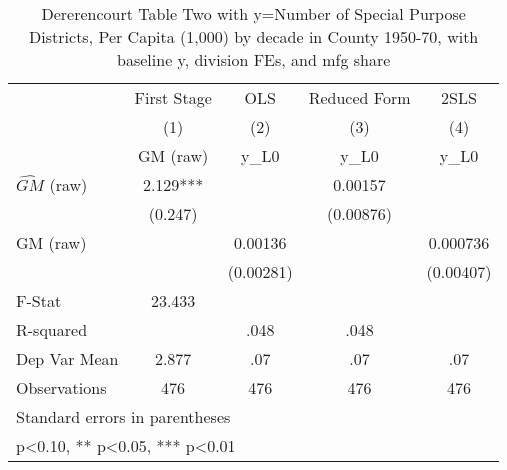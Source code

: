 \begin{table}[htbp]\centering
\def\sym#1{\ifmmode^{#1}\else\(^{#1}\)\fi}
\caption{Dererencourt Table Two with y=Number of Special Purpose Districts, Per Capita (1,000) by decade in County 1950-70, with baseline y, division FEs, and mfg share}
\begin{tabular}{l*{4}{c}}
\toprule
                    & First Stage   &         OLS   &Reduced Form   &        2SLS   \\
                    &\multicolumn{1}{c}{(1)}&\multicolumn{1}{c}{(2)}&\multicolumn{1}{c}{(3)}&\multicolumn{1}{c}{(4)}\\
                    &\multicolumn{1}{c}{GM  (raw)}&\multicolumn{1}{c}{y\_L0}&\multicolumn{1}{c}{y\_L0}&\multicolumn{1}{c}{y\_L0}\\
\midrule
$\hat{GM}$ (raw)    &       2.129***&               &     0.00157   &               \\
                    &     (0.247)   &               &   (0.00876)   &               \\
\addlinespace
GM  (raw)           &               &     0.00136   &               &    0.000736   \\
                    &               &   (0.00281)   &               &   (0.00407)   \\
\midrule
F-Stat              &      23.433   &               &               &               \\
R-squared           &               &        .048   &        .048   &               \\
Dep Var Mean        &       2.877   &         .07   &         .07   &         .07   \\
Observations        &         476   &         476   &         476   &         476   \\
\bottomrule
\multicolumn{5}{l}{\footnotesize Standard errors in parentheses}\\
\multicolumn{5}{l}{\footnotesize * p<0.10, ** p<0.05, *** p<0.01}\\
\end{tabular}
\end{table}
